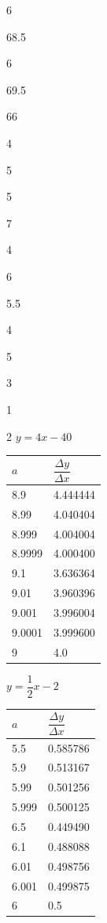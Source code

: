 \documentclass{book}
\begin{document}
\begin{appendices}
\begin{enumerate}[!HW!]
\begin{multicols}{6}
\item 68.5
\end{multicols}

\begin{multicols}{6}
\item 69.5
\item 66

\item 4
\item 5
\item 5
\end{multicols}
\begin{multicols}{7}
\item 4
\item 6
\item 5.5
\item 4
\item 5
\item 3
\item 1
\end{multicols}
\begin{multicols}{2}
\itemspade $y=4x-40$

\begin{tabular}{l|l}
$a$ & $\dfrac{\Delta y}{\Delta x}$ \\ \hline
8.9 & 4.444444\\
8.99 & 4.040404\\
8.999 & 4.004004\\
8.9999 & 4.000400\\
9.1 &  3.636364\\
9.01 & 3.960396\\
9.001 & 3.996004\\
9.0001 & 3.999600\\
9 & 4.0
\end{tabular} 

\itemspade $y=\dfrac{1}{2}x-2$

\begin{tabular}{l|l}
$a$ & $\dfrac{\Delta y}{\Delta x}$ \\ \hline
5.5 & 0.585786\\
5.9 & 0.513167\\
5.99 & 0.501256\\
5.999 & 0.500125\\
6.5 &  0.449490\\
6.1 & 0.488088\\
6.01 & 0.498756\\
6.001 & 0.499875\\
6 & 0.5
\end{tabular} 
\end{multicols}


\end{enumerate}
\end{appendices}
\end{document}
